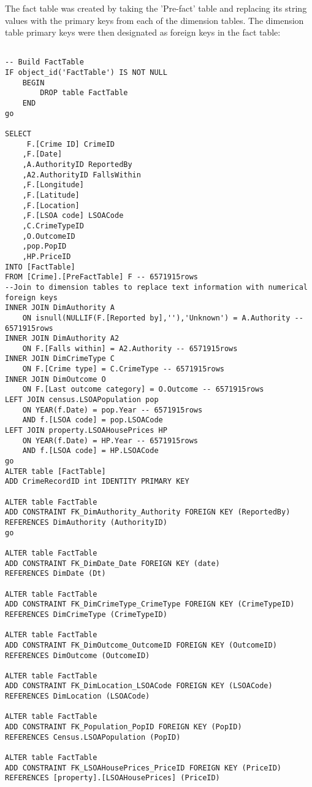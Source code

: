 \documentclass{article}
\begin{document}
The fact table was created by taking the 'Pre-fact' table and replacing its string values with the primary keys from each of the dimension tables. The dimension table primary keys were then designated as foreign keys in the fact table:
\begin{lstlisting}

-- Build FactTable
IF object_id('FactTable') IS NOT NULL 
	BEGIN 
		DROP table FactTable
	END
go

SELECT 
	 F.[Crime ID] CrimeID
	,F.[Date]
	,A.AuthorityID ReportedBy
	,A2.AuthorityID FallsWithin
	,F.[Longitude]
	,F.[Latitude]
	,F.[Location]
	,F.[LSOA code] LSOACode
	,C.CrimeTypeID
	,O.OutcomeID
	,pop.PopID
	,HP.PriceID
INTO [FactTable] 
FROM [Crime].[PreFactTable] F -- 6571915rows
--Join to dimension tables to replace text information with numerical foreign keys
INNER JOIN DimAuthority A
	ON isnull(NULLIF(F.[Reported by],''),'Unknown') = A.Authority -- 6571915rows
INNER JOIN DimAuthority A2
	ON F.[Falls within] = A2.Authority -- 6571915rows
INNER JOIN DimCrimeType C
	ON F.[Crime type] = C.CrimeType -- 6571915rows
INNER JOIN DimOutcome O
	ON F.[Last outcome category] = O.Outcome -- 6571915rows
LEFT JOIN census.LSOAPopulation pop
	ON YEAR(f.Date) = pop.Year -- 6571915rows
	AND f.[LSOA code] = pop.LSOACode
LEFT JOIN property.LSOAHousePrices HP
	ON YEAR(f.Date) = HP.Year -- 6571915rows
	AND f.[LSOA code] = HP.LSOACode
go
ALTER table [FactTable]
ADD CrimeRecordID int IDENTITY PRIMARY KEY

ALTER table FactTable
ADD CONSTRAINT FK_DimAuthority_Authority FOREIGN KEY (ReportedBy) 
REFERENCES DimAuthority (AuthorityID)
go

ALTER table FactTable
ADD CONSTRAINT FK_DimDate_Date FOREIGN KEY (date) 
REFERENCES DimDate (Dt)

ALTER table FactTable
ADD CONSTRAINT FK_DimCrimeType_CrimeType FOREIGN KEY (CrimeTypeID) 
REFERENCES DimCrimeType (CrimeTypeID)

ALTER table FactTable
ADD CONSTRAINT FK_DimOutcome_OutcomeID FOREIGN KEY (OutcomeID) 
REFERENCES DimOutcome (OutcomeID)

ALTER table FactTable
ADD CONSTRAINT FK_DimLocation_LSOACode FOREIGN KEY (LSOACode) 
REFERENCES DimLocation (LSOACode)

ALTER table FactTable
ADD CONSTRAINT FK_Population_PopID FOREIGN KEY (PopID) 
REFERENCES Census.LSOAPopulation (PopID)

ALTER table FactTable
ADD CONSTRAINT FK_LSOAHousePrices_PriceID FOREIGN KEY (PriceID) 
REFERENCES [property].[LSOAHousePrices] (PriceID)

\end{lstlisting}
\bigskip
\end{document}
